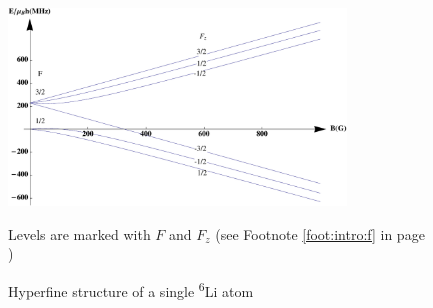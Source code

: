 \begin{figure}[htbp]
\begin{center}
\includegraphics[width=0.8\textwidth]{hyperfineLi6}
\caption{Hyperfine structure of a single \textsuperscript{6}Li atom } 
Levels are marked with $F$ and $F_{z}$ {(see Footnote \ref{foot:intro:f} in page \pageref{foot:intro:f})}
\label{fig:intro:li6}
\end{center}
\end{figure}



